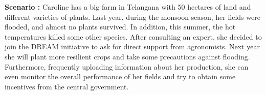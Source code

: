 \begin{flushleft}
\textbf{Scenario :} 
Caroline has a big farm in Telangana with 50 hectares of land and different varieties of plants. Last year, during the monsoon season, her fields were flooded, and almost no plants survived. In addition, this summer, the hot temperatures killed some other species. After consulting an expert, she decided to join the DREAM initiative to ask for direct support from agronomists. Next year she will plant more resilient crops and take some precautions against flooding. Furthermore, frequently uploading information about her production, she can even monitor the overall performance of her fields and try to obtain some incentives from the central government.
\end{flushleft}